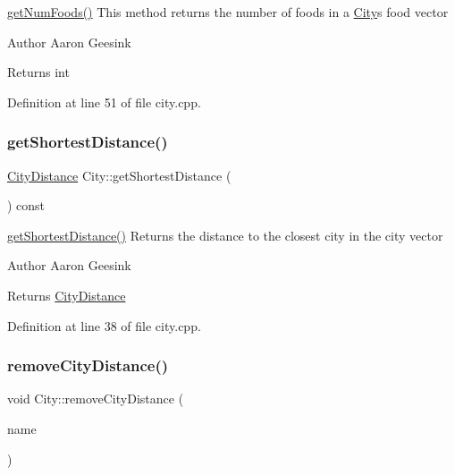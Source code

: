 \mbox{\hyperlink{class_city_a1462a90a0d40e0d946903b1db214da0e}{get\+Num\+Foods()}} This method returns the number of foods in a \mbox{\hyperlink{class_city}{City}}\textquotesingle{}s food vector 

\begin{DoxyAuthor}{Author}
Aaron Geesink 
\end{DoxyAuthor}
\begin{DoxyReturn}{Returns}
int 
\end{DoxyReturn}


Definition at line 51 of file city.\+cpp.

\mbox{\label{class_city_ad577ecd4be83b37ef2f9c5ff547f5259}} 
\subsubsection{\texorpdfstring{getShortestDistance()}{getShortestDistance()}}
{\footnotesize\ttfamily \mbox{\hyperlink{struct_city_distance}{City\+Distance}} City\+::get\+Shortest\+Distance (\begin{DoxyParamCaption}{ }\end{DoxyParamCaption}) const}



\mbox{\hyperlink{class_city_ad577ecd4be83b37ef2f9c5ff547f5259}{get\+Shortest\+Distance()}} Returns the distance to the closest city in the city vector 

\begin{DoxyAuthor}{Author}
Aaron Geesink 
\end{DoxyAuthor}
\begin{DoxyReturn}{Returns}
\mbox{\hyperlink{struct_city_distance}{City\+Distance}} 
\end{DoxyReturn}


Definition at line 38 of file city.\+cpp.

\mbox{\label{class_city_ac4829f9fc09b4c0f4cf2f7453c974264}} 
\subsubsection{\texorpdfstring{removeCityDistance()}{removeCityDistance()}}
{\footnotesize\ttfamily void City\+::remove\+City\+Distance (\begin{DoxyParamCaption}\item[{Q\+String}]{name }\end{DoxyParamCaption})}




